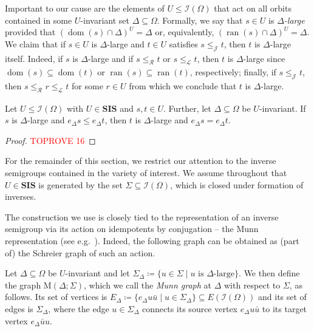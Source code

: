 \documentclass[anonymous,letter,UKenglish,cleveref,autoref,thm-restate]{lipics-v2021}
\renewcommand{\leq}{\leqslant}
\newcommand{\eg}{e.g.~}
\newcommand{\sse}{\subseteq}
\newcommand{\dom}{\operatorname{dom}}
\newcommand{\ran}{\operatorname{ran}}
\newcommand{\vSI}{\ensuremath{\mathbf{SIS}}}
\newcommand{\ISym}{\cI}
\newcommand*{\gLle}[1][]{\leq_{\mathcal{L}_{#1}}}
\newcommand*{\gRle}[1][]{\leq_{\mathcal{R}_{#1}}}
\newcommand*{\gJle}[1][]{\leq_{\mathcal{J}_{#1}}}
\newcommand{\cI}{\mathcal{I}}
\theoremstyle{plain}
\theoremstyle{plain}
\begin{document}
Important to our cause are the elements of $U \leq \ISym(\Omega)$ that act on all orbits contained in some $U$-invariant set $\Delta \sse \Omega$.
Formally, we say that $s \in U$ is \emph{$\Delta$-large} provided that $(\dom(s)\cap \Delta)^U = \Delta$ or, equivalently, $(\ran(s)\cap \Delta)^U = \Delta$.
We claim that if $s \in U$ is $\Delta$-large and $t \in U$ satisfies $s \gJle t$, then $t$ is $\Delta$-large itself.
Indeed, if $s$ is $\Delta$-large and if $s \gRle t$ or $s \gLle t$, then $t$ is $\Delta$-large since $\dom(s) \sse \dom(t)$ or $\ran(s) \sse \ran(t)$, respectively; finally, if $s \gJle t$, then $s \gRle r \gLle t$ for some $r \in U$ from which we conclude that $t$ is $\Delta$-large.

\begin{lemma}\label{lem:gb-large}
  Let $U \leq \ISym(\Omega)$ with $U \in \vSI$ and $s,t \in U$. 
  Further, let $\Delta \sse \Omega$ be $U$-invariant.
  If $s$ is $\Delta$-large and $e_\Delta s \leq e_\Delta t$, then $t$ is $\Delta$-large and $e_\Delta s = e_\Delta t$.
\end{lemma}

\begin{proof}\textcolor{red}{TOPROVE 16}\end{proof}

For the remainder of this section, we restrict our attention to the inverse semigroups contained in the variety of interest.
We assume throughout that $U \in \vSI$ is generated by the set $\Sigma \sse \ISym(\Omega)$, which is closed under formation of inverses.

The construction we use is closely tied to the representation of an inverse semigroup via its action on idempotents by conjugation -- the Munn representation (see \eg \cite{Petrich84,Law99}).
Indeed, the following graph can be obtained as (part of) the Schreier graph of such an action.


\begin{definition}\label{def:gb-munn}
  Let $\Delta \sse \Omega$ be $U$-invariant and let $\Sigma_\Delta \coloneqq \{ u \in \Sigma \mid u \text{ is $\Delta$-large} \}$.
  We then define the graph $\mathrm{M}(\Delta; \Sigma)$, which we call the \emph{Munn graph} at $\Delta$ with respect to $\Sigma$, as follows.
  Its set of vertices is $E_\Delta \coloneqq \{e_\Delta u\bar u \mid u \in \Sigma_\Delta\} \sse E(\ISym(\Omega))$ and its set of edges is $\Sigma_\Delta$, where the edge $u \in \Sigma_\Delta$ connects its source vertex $e_\Delta u\bar u$ to its target vertex $e_\Delta \bar uu$.
\end{definition}
\end{document}
